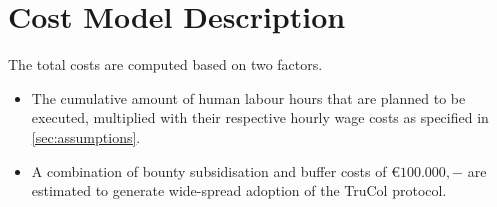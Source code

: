 \section{Cost Model Description}\label{sec:model_description}
The total costs are computed based on two factors.
\begin{itemize}
	\item The cumulative amount of human labour hours that are planned to be executed, multiplied with their respective hourly wage costs as specified in \cref{sec:assumptions}.
	\item A combination of bounty subsidisation and buffer costs of \euro$100.000,-$ are estimated to generate wide-spread adoption of the TruCol protocol.
\end{itemize}

